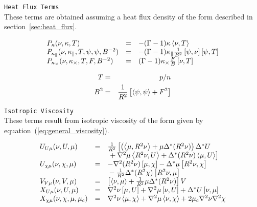 \texttt{Heat Flux Terms}
\\
These terms are obtained assuming a heat flux density of the form
described in section~\ref{sec:heat_flux}.

\begin{equation}
  \begin{array}{lcl}
    P_\kappa(\nu, \kappa, T) & = &
    -(\Gamma - 1) \kappa \left\langle \nu,T\right\rangle
    \\
    P_{\kappa_\parallel}(\nu, \kappa_\parallel, T, \psi, \psi, B^{-2}) & = &
    -(\Gamma - 1) \kappa_\parallel \frac{1}{B^2} \left[\psi,\nu\right] \left[\psi,T\right]
    \\
    P_{\kappa_\times}(\nu, \kappa_\times, T, F, B^{-2}) & = & 
    (\Gamma - 1) \kappa_\times \frac{F}{B} \left[\nu,T\right]
  \end{array}
\end{equation}

\begin{eqnarray*}
  T & = & p/n \\
  B^2 & = & \frac{1}{R^2} \left[ \left\langle \psi,\psi\right\rangle + F^2 \right]
\end{eqnarray*}


\texttt{Isotropic Viscosity}
\\
These terms result from isotropic viscosity of the form given by
equation~(\ref{eq:general_viscosity}).

\begin{equation}
  \begin{array}{lcl}
    U_{U \mu}(\nu, U, \mu) & = & \frac{1}{R^2} \left [ \left(
      \left\langle \mu,R^2 \nu\right\rangle + \mu \Delta^* (R^2 \nu) \right) \Delta^* U \right. \\
      & & \left. \mbox{} + \nabla^2 \mu \left\langle R^2 \nu,U\right\rangle 
      + \Delta^* (R^2 \nu) \left\langle \mu,U\right\rangle \right]
    \\
    U_{\chi \mu}(\nu, \chi, \mu) & = & -\nabla^2 (R^2 \nu) \left[\mu,\chi\right]
      - \Delta^* \mu\left[R^2\nu,\chi\right] \\ & & \mbox{}
      - \frac{1}{R^2}\Delta^* (R^2 \chi) \left[R^2 \nu,\mu\right]
    \\
    V_{V \mu}(\nu, V, \mu) & = & \left[\left\langle \nu,\mu\right\rangle 
      + \frac{1}{R^2}\mu \Delta^* (R^2 \nu) \right] V
    \\
    X_{U \mu}(\nu, U, \mu) & = & \nabla^2 \nu \left[\mu,U\right] 
      + \nabla^2 \mu \left[\nu,U\right] + \Delta^* U \left[\nu,\mu\right]
    \\
    X_{\chi \mu}(\nu, \chi, \mu, \mu_c) & = & 
      \nabla^2 \nu \left\langle \mu,\chi\right\rangle + \nabla^2 \mu \left\langle \nu,\chi\right\rangle
      + 2 \mu_c \nabla^2 \nu \nabla^2 \chi
  \end{array}
\end{equation}

